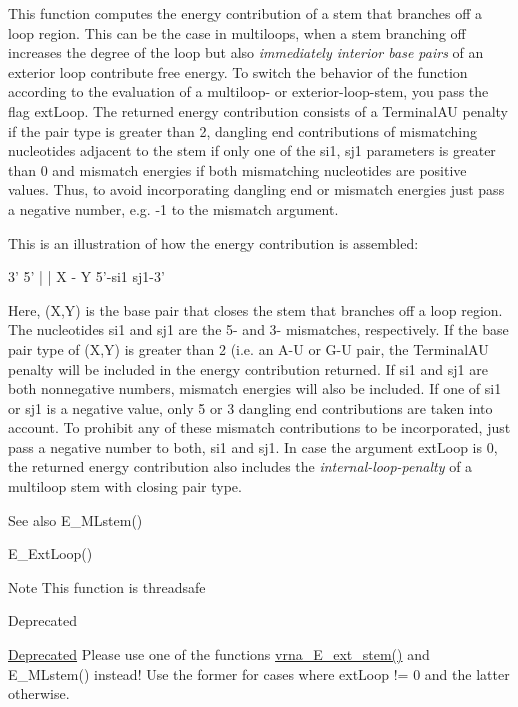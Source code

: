 This function computes the energy contribution of a stem that branches off a loop region. This can be the case in multiloops, when a stem branching off increases the degree of the loop but also {\itshape immediately interior base pairs} of an exterior loop contribute free energy. To switch the behavior of the function according to the evaluation of a multiloop-\/ or exterior-\/loop-\/stem, you pass the flag \textquotesingle{}ext\+Loop\textquotesingle{}. The returned energy contribution consists of a Terminal\+AU penalty if the pair type is greater than 2, dangling end contributions of mismatching nucleotides adjacent to the stem if only one of the si1, sj1 parameters is greater than 0 and mismatch energies if both mismatching nucleotides are positive values. Thus, to avoid incorporating dangling end or mismatch energies just pass a negative number, e.\+g. -\/1 to the mismatch argument.

This is an illustration of how the energy contribution is assembled\+: 
\begin{DoxyPre}
      3'  5'
      |   |
      X - Y
5'-si1     sj1-3'
\end{DoxyPre}


Here, (X,Y) is the base pair that closes the stem that branches off a loop region. The nucleotides si1 and sj1 are the 5\textquotesingle{}-\/ and 3\textquotesingle{}-\/ mismatches, respectively. If the base pair type of (X,Y) is greater than 2 (i.\+e. an A-\/U or G-\/U pair, the Terminal\+AU penalty will be included in the energy contribution returned. If si1 and sj1 are both nonnegative numbers, mismatch energies will also be included. If one of si1 or sj1 is a negative value, only 5\textquotesingle{} or 3\textquotesingle{} dangling end contributions are taken into account. To prohibit any of these mismatch contributions to be incorporated, just pass a negative number to both, si1 and sj1. In case the argument ext\+Loop is 0, the returned energy contribution also includes the {\itshape internal-\/loop-\/penalty} of a multiloop stem with closing pair type.

\begin{DoxySeeAlso}{See also}
E\+\_\+\+M\+Lstem() 

E\+\_\+\+Ext\+Loop() 
\end{DoxySeeAlso}
\begin{DoxyNote}{Note}
This function is threadsafe
\end{DoxyNote}
\begin{DoxyRefDesc}{Deprecated}
\item[\mbox{\hyperlink{deprecated__deprecated000152}{Deprecated}}]Please use one of the functions \mbox{\hyperlink{group__eval__loops__ext_gaa0c313c90da11aa741dcd62746d85337}{vrna\+\_\+\+E\+\_\+ext\+\_\+stem()}} and E\+\_\+\+M\+Lstem() instead! Use the former for cases where {\ttfamily ext\+Loop} != 0 and the latter otherwise.\end{DoxyRefDesc}



